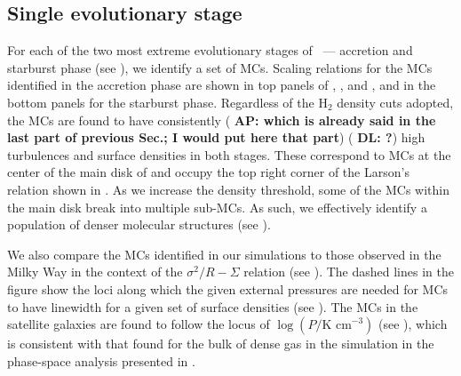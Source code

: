 \IfFileExists{emulateapjlegacy.cls}{\documentclass[iop]{emulateapjlegacy}}{\documentclass[iop]{emulateapj}}
\newcommand{\AP}[1]{({\bf \color{apcolor} AP: #1})}
\newcommand{\DL}[1]{({\bf \color{dlcolor} DL: #1})}
\begin{document}
\subsection{Single evolutionary stage}  \label{sec:singless}

For each of the two most extreme evolutionary stages of \flower\ --- accretion and starburst phase (see ), we identify a set of MCs.
%
Scaling relations for the MCs identified in the accretion phase are shown in top panels of , , and , and in the bottom panels for the starburst phase.
%
Regardless of the H$_2$ density cuts adopted, the MCs are found to have consistently \AP{which is already said in the last part of previous Sec.; I would put here that part} \DL{?}
high turbulences and surface densities in both stages. These correspond to MCs at the center of the main disk of \flower and occupy the top right corner of the Larson's relation shown in .
%
As we increase the density threshold, some of the MCs within the main disk break into multiple sub-MCs. As such, we effectively identify a population of denser molecular structures (see ).

We also compare the MCs identified in our simulations to those observed in the Milky Way in the context of the $\sigma^2/R - \Sigma$ relation (see ). The dashed lines in the figure show the loci along which the given external pressures are needed for MCs to have linewidth for a given set of surface densities (see ).
The MCs in the satellite galaxies are found to follow the locus of $\log{(P/\textrm{K cm}^{-3})}$ (see ), which 
is consistent with that found for the bulk of dense gas in the simulation in the phase-space analysis presented in \citet{Pallottini17a}.
\end{document}
